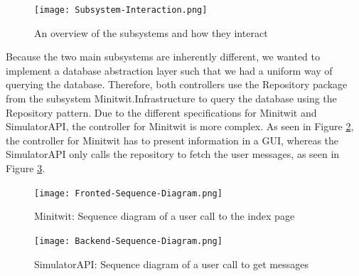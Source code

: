 \begin{figure}[H]
    \begin{center}
        \texttt{[image: Subsystem-Interaction.png]}
    \end{center}
    \caption{An overview of the subsystems and how they interact}
    \label{fig:subsystem-interaction}
\end{figure}

Because the two main subsystems are inherently different, we wanted to implement a database abstraction layer such that we had a uniform way of querying the database. Therefore, both controllers use the Repository package from the subsystem Minitwit.Infrastructure to query the database using the Repository pattern\cite{repo_pattern}.
Due to the different specifications for Minitwit and SimulatorAPI, the controller for Minitwit is more complex. As seen in Figure \ref{fig:frontend-interaction}, the controller for Minitwit has to present information in a GUI, whereas the SimulatorAPI only calls the repository to fetch the user messages, as seen in Figure \ref{fig:backend-interaction}.
\begin{figure}[H]
    \begin{center}
        \texttt{[image: Fronted-Sequence-Diagram.png]}
    \end{center}
    \caption{Minitwit: Sequence diagram of a user call to the index page}
    \label{fig:frontend-interaction}
\end{figure}
\begin{figure}[H]
    \begin{center}
        \texttt{[image: Backend-Sequence-Diagram.png]}
    \end{center}
    \caption{SimulatorAPI: Sequence diagram of a user call to get messages}
    \label{fig:backend-interaction}
\end{figure}



